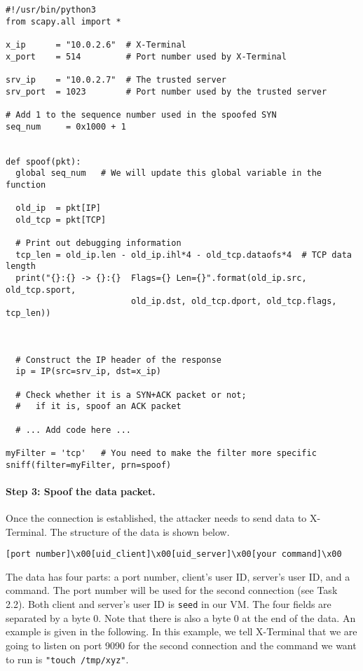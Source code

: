 \begin{lstlisting}
#!/usr/bin/python3
from scapy.all import *

x_ip      = "10.0.2.6"  # X-Terminal
x_port    = 514         # Port number used by X-Terminal

srv_ip    = "10.0.2.7"  # The trusted server
srv_port  = 1023        # Port number used by the trusted server

# Add 1 to the sequence number used in the spoofed SYN
seq_num     = 0x1000 + 1


def spoof(pkt):
  global seq_num   # We will update this global variable in the function

  old_ip  = pkt[IP]
  old_tcp = pkt[TCP]

  # Print out debugging information
  tcp_len = old_ip.len - old_ip.ihl*4 - old_tcp.dataofs*4  # TCP data length
  print("{}:{} -> {}:{}  Flags={} Len={}".format(old_ip.src, old_tcp.sport,
                         old_ip.dst, old_tcp.dport, old_tcp.flags, tcp_len))



  # Construct the IP header of the response
  ip = IP(src=srv_ip, dst=x_ip)

  # Check whether it is a SYN+ACK packet or not;
  #   if it is, spoof an ACK packet

  # ... Add code here ...

myFilter = 'tcp'   # You need to make the filter more specific
sniff(filter=myFilter, prn=spoof)

\end{lstlisting}




\paragraph{Step 3: Spoof the \rsh data packet.}
Once the connection is established, the attacker needs to 
send \rsh data to X-Terminal.
The structure of the \rsh data is shown below.

\begin{lstlisting}
[port number]\x00[uid_client]\x00[uid_server]\x00[your command]\x00
\end{lstlisting}

The data has four parts: a port number, client's user ID, server's user ID,
and a command.
The port number will be used for the second connection (see Task 2.2). 
Both client and server's user ID is \texttt{seed} in our VM. 
The four fields are separated by a byte 0.
Note that there is also a byte 0 at the end of the \rsh data. An example is given in the
following. In this example, we tell X-Terminal that we are going to listen on port 9090 for the
second connection and the command we want to run is \texttt{"touch /tmp/xyz"}. 

